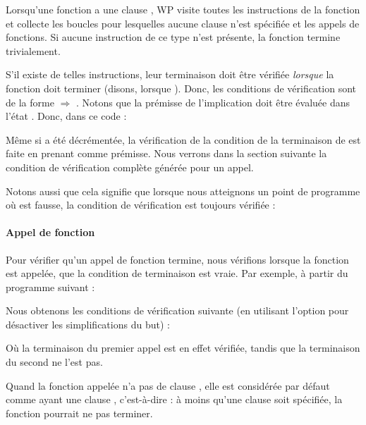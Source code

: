 Lorsqu'une fonction a une clause , WP visite toutes les
instructions de la fonction et collecte les boucles pour lesquelles aucune
clause  n'est spécifiée et les appels de fonctions. Si
aucune instruction de ce type n'est présente, la fonction termine trivialement.




S'il existe de telles instructions, leur terminaison doit être vérifiée
\textit{lorsque} la fonction doit terminer (disons, lorsque ). Donc,
les conditions de vérification sont de la forme
 $\Rightarrow$ .
Notons que la prémisse de l'implication doit être évaluée dans l'état
. Donc, dans ce code :




Même si  a été décrémentée, la vérification de la condition de
la terminaison de  est faite en prenant
 comme prémisse. Nous verrons dans
la section suivante la condition de vérification complète générée pour un appel.


Notons aussi que cela signifie que lorsque nous atteignons un point de programme
où  est fausse, la condition de vérification est toujours
vérifiée :




\paragraph{Appel de fonction}


Pour vérifier qu'un appel de fonction termine, nous vérifions lorsque la
fonction est appelée, que la condition de terminaison est vraie. Par exemple, à
partir du programme suivant :




Nous obtenons les conditions de vérification suivante (en utilisant l'option
 pour désactiver les simplifications du but) :






Où la terminaison du premier appel est en effet vérifiée, tandis que la
terminaison du second ne l'est pas.


Quand la fonction appelée n'a pas de clause , elle est
considérée par défaut comme ayant une clause ,
c'est-à-dire : à moins qu'une clause  soit spécifiée,
la fonction pourrait ne pas terminer.


